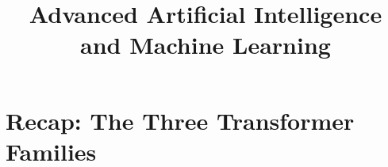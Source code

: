 




\newcommand{\ques}{\textbf{\textcolor{red}{Question:  }}}
\newcommand{\myblue}[1]{\textcolor{blue}{#1}}
\newcommand{\citebutton}[2]{\beamergotobutton{\href{#2}{#1}}}
\newcommand\warning{%
 \makebox[1.4em][c]{%
 \makebox[0pt][c]{\raisebox{.1em}{\scriptsize!}}%
 \makebox[0pt][c]{\color{red}\normalsize$\bigtriangleup$}}}%

\newcommand{\titlefigure}{figure/62-t5.png}
\newcommand{\learninggoals}{
  \item The three Transformer families (recap) and evidence they show up beyond NLP: Vision Transformer, CLIP, Flamingo, GPT-4, Whisper
  \item BERT: masked language modeling, bidirectionality, the {\tt [CLS]}/{\tt [SEP]} input format, and how to derive its parameter count
  \item How the BERT family evolved: RoBERTa (better-trained BERT), ALBERT (parameter-efficient), DistilBERT (distilled), ELECTRA (a different self-supervised objective)
  \item BERTology: what studying attention patterns and attention heads reveals about what BERT actually learns
  \item T5: reframing every NLP task as text-to-text, and why encoder-decoder pretraining needs a different objective than BERT's
}

\title{Advanced Artificial Intelligence and Machine Learning}
\date{}




\section{Recap: The Three Transformer Families}

